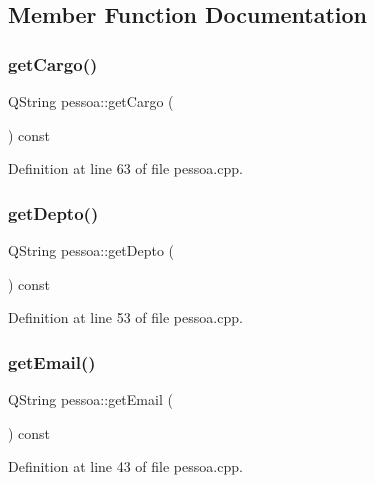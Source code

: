 \subsection{Member Function Documentation}
\hypertarget{classpessoa_a07fe59858c0c8ff2d3bb6bc3879de6b3}{}\label{classpessoa_a07fe59858c0c8ff2d3bb6bc3879de6b3} 
\subsubsection{\texorpdfstring{get\+Cargo()}{getCargo()}}
{\footnotesize\ttfamily Q\+String pessoa\+::get\+Cargo (\begin{DoxyParamCaption}{ }\end{DoxyParamCaption}) const}



Definition at line 63 of file pessoa.\+cpp.

\hypertarget{classpessoa_a1acfd4c15d0b8bfc1140f6063a1739ae}{}\label{classpessoa_a1acfd4c15d0b8bfc1140f6063a1739ae} 
\subsubsection{\texorpdfstring{get\+Depto()}{getDepto()}}
{\footnotesize\ttfamily Q\+String pessoa\+::get\+Depto (\begin{DoxyParamCaption}{ }\end{DoxyParamCaption}) const}



Definition at line 53 of file pessoa.\+cpp.

\hypertarget{classpessoa_a4a12f308282c24e8591a8e8676624695}{}\label{classpessoa_a4a12f308282c24e8591a8e8676624695} 
\subsubsection{\texorpdfstring{get\+Email()}{getEmail()}}
{\footnotesize\ttfamily Q\+String pessoa\+::get\+Email (\begin{DoxyParamCaption}{ }\end{DoxyParamCaption}) const}



Definition at line 43 of file pessoa.\+cpp.

\hypertarget{classpessoa_ad1bad474adbfadf472ad857a7c5f181c}{}\label{classpessoa_ad1bad474adbfadf472ad857a7c5f181c} 
